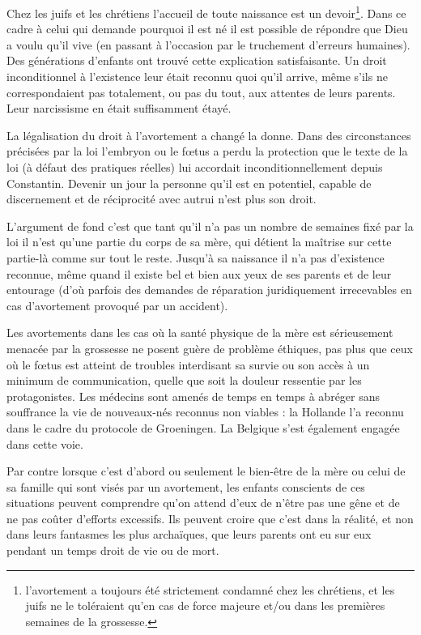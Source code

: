 Chez les juifs et les chrétiens l'accueil de toute naissance est un devoir\footnote{l'avortement a toujours été strictement condamné chez les chrétiens, et les juifs ne le toléraient qu'en cas de force majeure et/ou dans les premières semaines de la grossesse.}. Dans ce cadre à celui qui demande pourquoi il est né il est possible de répondre que Dieu a voulu qu'il vive (en passant à l’occasion par le truchement d’erreurs humaines). Des générations d'enfants ont trouvé cette explication satisfaisante. Un droit inconditionnel à l'existence leur était reconnu quoi qu'il arrive, même s'ils ne correspondaient pas totalement, ou pas du tout, aux attentes de leurs parents. Leur narcissisme en était suffisamment étayé.

La légalisation du droit à l'avortement a changé la donne. Dans des circonstances précisées par la loi l'embryon ou le fœtus a perdu la protection que le texte de la loi (à défaut des pratiques réelles) lui accordait inconditionnellement depuis Constantin. Devenir un jour la personne qu'il est en potentiel, capable de discernement et de réciprocité avec autrui  n'est plus son droit. 

L'argument de fond c'est que tant qu'il n'a pas un nombre de semaines fixé par la loi il n'est qu'une partie du corps de sa mère, qui détient la maîtrise sur cette partie-là comme sur tout le reste. Jusqu'à sa naissance il n'a pas d’existence reconnue, même quand il existe bel et bien aux yeux de ses parents et de leur entourage (d’où parfois des demandes de réparation juridiquement irrecevables en cas d’avortement provoqué par un accident).

Les avortements dans les cas où la santé physique de la mère est sérieusement menacée par la grossesse ne posent guère de problème éthiques, pas plus que ceux où le fœtus est atteint de troubles interdisant sa survie ou son accès à un minimum de communication, quelle que soit la douleur ressentie par les protagonistes. Les médecins sont amenés de temps en temps à abréger sans souffrance la vie de nouveaux-nés reconnus non viables : la Hollande l'a reconnu dans le cadre du protocole de Groeningen. La Belgique s'est également engagée dans cette voie. 

 Par contre lorsque c'est d'abord ou seulement le bien-être de la mère ou celui de sa famille qui sont visés par un avortement, les enfants conscients de ces situations peuvent comprendre qu'on attend d'eux de n'être pas une gêne et de ne pas coûter d'efforts excessifs. Ils peuvent croire que c'est dans la réalité, et non dans leurs fantasmes les plus archaïques, que leurs parents ont eu sur eux pendant un temps droit de vie ou de mort.
 
